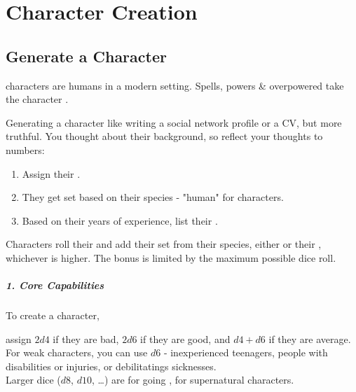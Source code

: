\documentclass{LegrandOrangeTufteBook}
\begin{document}
\chapterspaceabove{2.75cm}
\chapterspacebelow{5.25cm}


\chapter*{Character Creation}

\section*{Generate a  Character}
\begin{marginNote}
	 characters are humans in a modern setting.
	Spells, powers \& overpowered  take the character .
\end{marginNote}
Generating a character like writing a social network profile or a CV, but more truthful.
You thought about their background, so reflect your thoughts to numbers:
\begin{enumerate}
	\item Assign their .
	\item They get set  based on their species - "human" for  characters.
	\item Based on their years of experience, list their .
\end{enumerate}

Characters roll their  and
add their set  from their species, either  or their , whichever is higher.
The bonus is limited by the maximum possible dice roll.\\

\paragraph*{1. Core Capabilities}


To create a  character,
\begin{marginNote}
	
\end{marginNote}
assign $2d4$ if they are bad,
$2d6$ if they are good, and $d4 + d6$ if they are average.\\
For weak characters, you can use $d6$ - inexperienced teenagers, people with disabilities or injuries, or debilitatings sicknesses.\\
Larger dice ($d8$, $d10$, \ldots) are for going , for supernatural characters.
\end{document}
